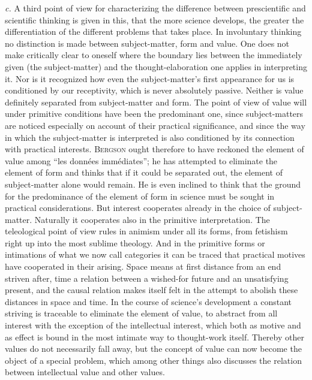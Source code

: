 \documentclass[12pt]{book}
\newcommand{\opage}[1]{\marginnote{\footnotesize\textit{[#1]}}}
\begin{document}
\textit{c.} A third point of view for characterizing the difference between
prescientific and scientific thinking is given in this, that the more science
develops, the greater the differentiation of the different problems that takes
place. In involuntary thinking no distinction is made between subject-matter,
form and value. One does not make critically clear to oneself where the boundary
lies between the immediately given (the subject-matter) and the
thought-elaboration one applies in interpreting it. Nor is it recognized how
even the subject-matter's first appearance for us is conditioned by our
receptivity, which is never absolutely passive. Neither is value definitely
separated from subject-matter and form. The point of view of value will under
primitive conditions have been the predominant one, since subject-matters are
noticed especially on account of their practical significance, and since the way
in which the subject-matter is interpreted is also conditioned by its connection
with practical interests. \textsc{Bergson} ought therefore to have reckoned the
element of value among ``les données immédiates''; he has attempted to eliminate
the element of form and thinks that if it could be separated out, the element of
subject-matter alone would remain. He is \opage{13}even inclined to think that the ground
for the predominance of the element of form in science must be sought in
practical considerations. But interest cooperates already in the choice of
subject-matter. Naturally it cooperates also in the primitive interpretation.
The teleological point of view rules in animism under all its forms, from
fetishism right up into the most sublime theology. And in the primitive forms or
intimations of what we now call categories it can be traced that practical
motives have cooperated in their arising. Space means at first distance from an
end striven after, time a relation between a wished-for future and an
unsatisfying present, and the causal relation makes itself felt in the attempt
to abolish these distances in space and time. In the course of science's
development a constant striving is traceable to eliminate the element of value,
to abstract from all interest with the exception of the intellectual interest,
which both as motive and as effect is bound in the most intimate way to
thought-work itself. Thereby other values do not necessarily fall away, but the
concept of value can now become the object of a special problem, which among
other things also discusses the relation between intellectual value and other
values.
\end{document}
